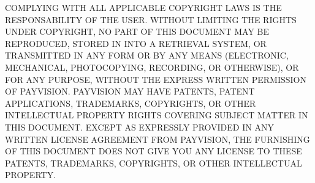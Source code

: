 COMPLYING WITH ALL APPLICABLE COPYRIGHT LAWS IS THE RESPONSABILITY OF THE USER. WITHOUT LIMITING THE RIGHTS UNDER COPYRIGHT, NO PART OF THIS DOCUMENT MAY BE REPRODUCED, STORED IN INTO A RETRIEVAL SYSTEM, OR TRANSMITTED IN ANY FORM OR BY ANY MEANS (ELECTRONIC, MECHANICAL, PHOTOCOPYING, RECORDING, OR OTHERWISE), OR FOR ANY PURPOSE, WITHOUT THE EXPRESS WRITTEN PERMISSION OF PAYVISION.
PAYVISION MAY HAVE PATENTS, PATENT APPLICATIONS, TRADEMARKS, COPYRIGHTS, OR OTHER INTELLECTUAL PROPERTY RIGHTS COVERING SUBJECT MATTER IN THIS DOCUMENT. EXCEPT AS EXPRESSLY PROVIDED IN ANY WRITTEN LICENSE AGREEMENT FROM PAYVISION, THE FURNISHING OF THIS DOCUMENT DOES NOT GIVE YOU ANY LICENSE TO THESE PATENTS, TRADEMARKS, COPYRIGHTS, OR OTHER INTELLECTUAL PROPERTY.